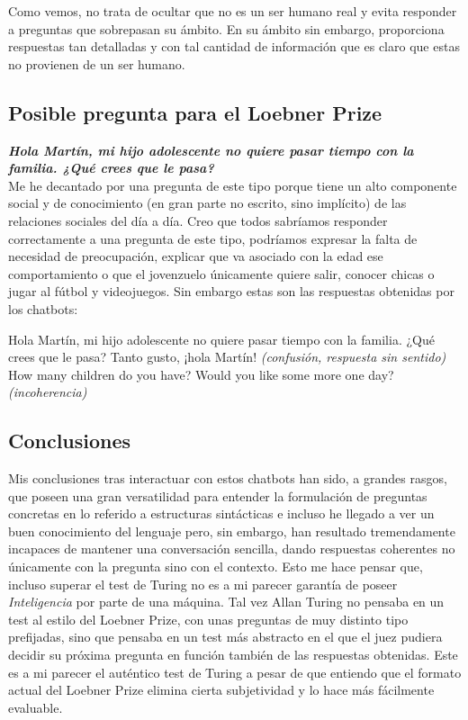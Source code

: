 \documentclass[final]{CSP}
\begin{document}
Como vemos, no trata de ocultar que no es un ser humano real y evita responder a preguntas que
sobrepasan su ámbito. En su ámbito sin embargo, proporciona respuestas tan detalladas y con tal
cantidad de información que es claro que estas no provienen de un ser humano.

\subsection{Posible pregunta para el Loebner Prize}

\textbf{\textit{Hola Martín, mi hijo adolescente no quiere pasar tiempo con la 
familia. ¿Qué crees que le pasa?}}\\
Me he decantado por una pregunta de este tipo porque tiene un alto componente social y de
conocimiento (en gran parte no escrito, sino implícito) de las relaciones sociales del día
a día. Creo que todos sabríamos responder correctamente a una pregunta de este tipo, podríamos
expresar la falta de necesidad de preocupación, explicar que va asociado con la edad ese 
comportamiento o que el jovenzuelo únicamente quiere salir, conocer chicas o jugar al fútbol
y videojuegos. Sin embargo estas son las respuestas obtenidas por los chatbots:
\begin{drama}

    \hspeaks Hola Martín, mi hijo adolescente no quiere pasar tiempo con la familia. ¿Qué crees 
             que le pasa?
    \mspeaks Tanto gusto, ¡hola Martín! \textit{(confusión, respuesta sin sentido)}
    \mispeaks How many children do you have? Would you like some more one day? 
              \textit{(incoherencia)}
\end{drama}

\subsection{Conclusiones}

Mis conclusiones tras interactuar con estos chatbots han sido, a grandes rasgos, que poseen una
gran versatilidad para entender la formulación de preguntas concretas en lo referido a estructuras
sintácticas e incluso he llegado a ver un buen conocimiento del lenguaje pero, sin embargo, han 
resultado tremendamente incapaces de mantener una conversación sencilla, dando respuestas 
coherentes no únicamente con la pregunta sino con el contexto. Esto me hace pensar que, incluso
superar el test de Turing no es a mi parecer garantía de poseer \textit{Inteligencia} por parte
de una máquina. Tal vez Allan Turing no pensaba en un test al estilo del Loebner Prize, con unas
preguntas de muy distinto tipo prefijadas, sino que pensaba en un test más abstracto en el que
el juez pudiera decidir su próxima pregunta en función también de las respuestas obtenidas. Este
es a mi parecer el auténtico test de Turing a pesar de que entiendo que el formato actual del 
Loebner Prize elimina cierta subjetividad y lo hace más fácilmente evaluable.
\end{document}
